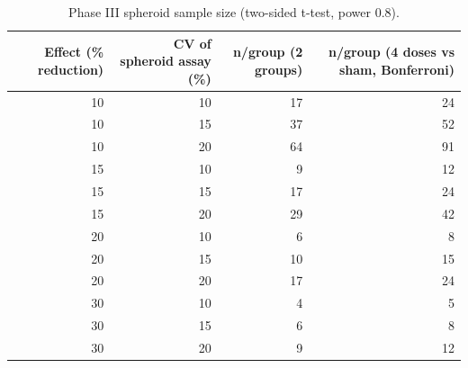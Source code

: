 \begin{table}
\caption{Phase III spheroid sample size (two-sided t-test, power 0.8).}
\label{tab:T_S11_sample_size}
\begin{tabular}{rrrr}
\toprule
Effect (\% reduction) & CV of spheroid assay (\%) & n/group (2 groups) & n/group (4 doses vs sham, Bonferroni) \\
\midrule
10 & 10 & 17 & 24 \\
10 & 15 & 37 & 52 \\
10 & 20 & 64 & 91 \\
15 & 10 & 9 & 12 \\
15 & 15 & 17 & 24 \\
15 & 20 & 29 & 42 \\
20 & 10 & 6 & 8 \\
20 & 15 & 10 & 15 \\
20 & 20 & 17 & 24 \\
30 & 10 & 4 & 5 \\
30 & 15 & 6 & 8 \\
30 & 20 & 9 & 12 \\
\bottomrule
\end{tabular}
\end{table}
